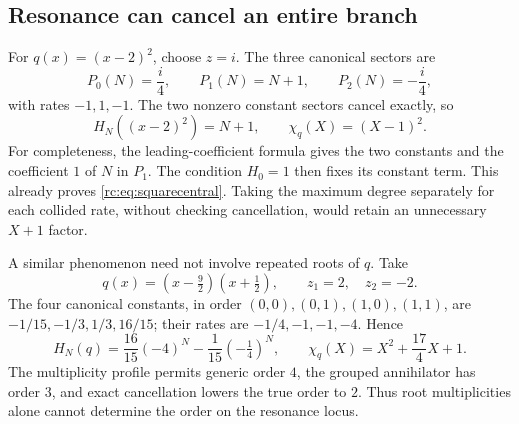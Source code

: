 \documentclass[11pt,a4paper]{article}
\numberwithin{equation}{section}
\theoremstyle{definition}
\theoremstyle{remark}
\begin{document}
\subsection{Resonance can cancel an entire branch}
For $q(x)=(x-2)^2$, choose $z=i$.  The three canonical sectors are
\begin{equation}\label{rc:eq:squarecentral}
 P_0(N)=\frac{i}{4},\qquad P_1(N)=N+1,\qquad
 P_2(N)=-\frac{i}{4},
\end{equation}
with rates $-1,1,-1$.  The two nonzero constant sectors cancel exactly,
so
\[
 H_N((x-2)^2)=N+1,\qquad \chi_q(X)=(X-1)^2.
\]
For completeness, the leading-coefficient formula gives the two constants
and the coefficient $1$ of $N$ in $P_1$.  The condition $H_0=1$ then
fixes its constant term.  This already proves \eqref{rc:eq:squarecentral}.
Taking the maximum degree separately for each collided rate, without
checking cancellation, would retain an unnecessary $X+1$ factor.

A similar phenomenon need not involve repeated roots of $q$.  Take
\begin{equation}\label{rc:eq:distinctresonance}
 q(x)=(x-\tfrac92)(x+\tfrac12),\qquad z_1=2,\quad z_2=-2.
\end{equation}
The four canonical constants, in order $(0,0),(0,1),(1,0),(1,1)$,
are $-1/15,-1/3,1/3,16/15$; their rates are
$-1/4,-1,-1,-4$.  Hence
\begin{equation}\label{rc:eq:distinctresresult}
 H_N(q)=\frac{16}{15}(-4)^N-\frac1{15}(-\tfrac14)^N,
 \qquad \chi_q(X)=X^2+\frac{17}{4}X+1.
\end{equation}
The multiplicity profile permits generic order $4$, the grouped
annihilator has order $3$, and exact cancellation lowers the true order
to $2$.  Thus root multiplicities alone cannot determine the order on
the resonance locus.
\end{document}
